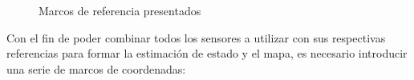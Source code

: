\begin{figure}
    \centering
    \qquad
    \caption{Marcos de referencia presentados}
    \label{fig:coordinateframes}
\end{figure}
Con el fin de poder combinar todos los sensores a utilizar con sus respectivas referencias para formar la estimación de estado y el mapa, es necesario introducir una serie de marcos de coordenadas:
